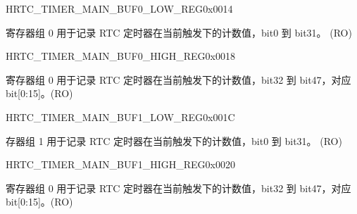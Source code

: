 \begin{register}{H}{RTC\_TIMER\_MAIN\_BUF0\_LOW\_REG}{0x0014}\label{regdesc:RTCTIMERMAINBUF0LOWREG}
%
\regnewline%
\begin{regdesc}\begin{reglist}
\label{fielddesc:RTCTIMERMAINBUF0LOW}\item [RTC\_TIMER\_MAIN\_BUF0\_LOW] 寄存器组 0 用于记录 RTC 定时器在当前触发下的计数值，bit0 到 bit31。 (RO)
\end{reglist}\end{regdesc}
\end{register}

\begin{register}{H}{RTC\_TIMER\_MAIN\_BUF0\_HIGH\_REG}{0x0018}\label{regdesc:RTCTIMERMAINBUF0HIGHREG}
%
\regnewline%
\begin{regdesc}\begin{reglist}
\label{fielddesc:RTCTIMERMAINBUF0HIGH}\item [RTC\_TIMER\_MAIN\_BUF0\_HIGH] 寄存器组 0 用于记录 RTC 定时器在当前触发下的计数值，bit32 到 bit47，对应 bit[0:15]。(RO)
\end{reglist}\end{regdesc}
\end{register}

\begin{register}{H}{RTC\_TIMER\_MAIN\_BUF1\_LOW\_REG}{0x001C}\label{regdesc:RTCTIMERMAINBUF1LOWREG}
%
\regnewline%
\begin{regdesc}\begin{reglist}
\label{fielddesc:RTCTIMERMAINBUF1LOW}\item [RTC\_TIMER\_MAIN\_BUF1\_LOW] 存器组 1 用于记录 RTC 定时器在当前触发下的计数值，bit0 到 bit31。 (RO)
\end{reglist}\end{regdesc}
\end{register}

\begin{register}{H}{RTC\_TIMER\_MAIN\_BUF1\_HIGH\_REG}{0x0020}\label{regdesc:RTCTIMERMAINBUF1HIGHREG}
%
\regnewline%
\begin{regdesc}\begin{reglist}
\label{fielddesc:RTCTIMERMAINBUF1HIGH}\item [RTC\_TIMER\_MAIN\_BUF1\_HIGH] 寄存器组 0 用于记录 RTC 定时器在当前触发下的计数值，bit32 到 bit47，对应 bit[0:15]。(RO)
\end{reglist}\end{regdesc}
\end{register}

